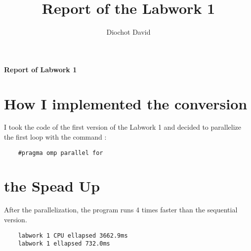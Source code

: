 \documentclass[a4paper]{article}
\title{Report of the Labwork 1}
\author{Diochot David}
\begin{document}
\begin{center}
    { \huge \bfseries Report of Labwork 1 \\[0.4cm] }
\end{center}


\section{How I implemented the conversion}

I took the code of the first version of the Labwork 1 and decided to parallelize the first
loop with the command : 
\begin{verbatim}
    #pragma omp parallel for
\end{verbatim}

\section{the Spead Up}

After the parallelization, the program runs 4 times faster than the sequential version.

\begin{verbatim}
    labwork 1 CPU ellapsed 3662.9ms
    labwork 1 ellapsed 732.0ms
\end{verbatim}
\end{document}
